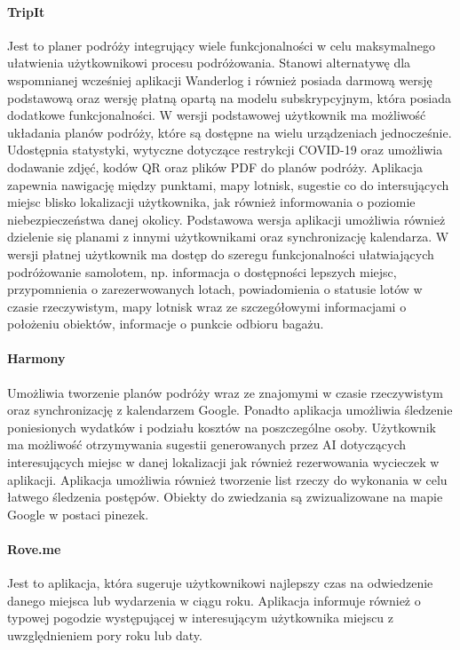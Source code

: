 \paragraph{TripIt}

Jest to planer podróży integrujący wiele funkcjonalności w celu maksymalnego ułatwienia użytkownikowi procesu podróżowania.
Stanowi alternatywę dla wspomnianej wcześniej aplikacji Wanderlog i również posiada darmową wersję podstawową oraz wersję płatną
opartą na modelu subskrypcyjnym, która posiada dodatkowe funkcjonalności. W wersji podstawowej użytkownik ma możliwość układania
planów podróży, które są dostępne na wielu urządzeniach jednocześnie. Udostępnia statystyki, wytyczne dotyczące restrykcji COVID-19
oraz umożliwia dodawanie zdjęć, kodów QR oraz plików PDF do planów podróży. Aplikacja zapewnia nawigację między punktami,
mapy lotnisk, sugestie co do intersujących miejsc blisko lokalizacji użytkownika,
jak również informowania o poziomie niebezpieczeństwa danej okolicy.
Podstawowa wersja aplikacji umożliwia również dzielenie się planami z innymi użytkownikami oraz synchronizację kalendarza.
W wersji płatnej użytkownik ma dostęp do szeregu funkcjonalności ułatwiających podróżowanie samolotem, np. informacja o dostępności
lepszych miejsc, przypomnienia o zarezerwowanych lotach, powiadomienia o statusie lotów w czasie rzeczywistym, mapy lotnisk wraz
ze szczegółowymi informacjami o położeniu obiektów, informacje o punkcie odbioru bagażu.

\paragraph{Harmony}

Umożliwia tworzenie planów podróży wraz ze znajomymi w czasie rzeczywistym oraz synchronizację z kalendarzem Google.
Ponadto aplikacja umożliwia śledzenie poniesionych wydatków i podziału kosztów na poszczególne osoby.
Użytkownik ma możliwość otrzymywania sugestii generowanych przez AI dotyczących interesujących miejsc w danej lokalizacji
jak również rezerwowania wycieczek w aplikacji. Aplikacja umożliwia również tworzenie list rzeczy do wykonania w
celu łatwego śledzenia postępów. Obiekty do zwiedzania są zwizualizowane na mapie Google w postaci pinezek.

\paragraph{Rove.me}

Jest to aplikacja, która sugeruje użytkownikowi najlepszy czas na odwiedzenie danego miejsca lub wydarzenia w ciągu roku.
Aplikacja informuje również o typowej pogodzie występującej w interesującym użytkownika miejscu z uwzględnieniem pory roku lub daty.

